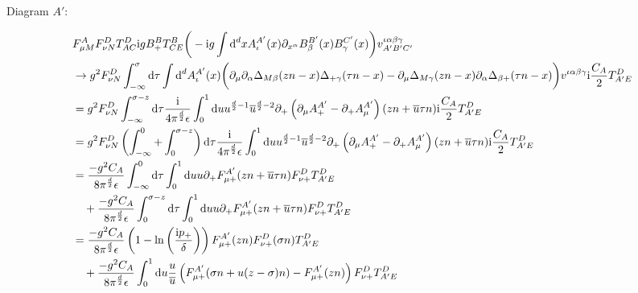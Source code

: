 Diagram $A'$:

\begin{align}
	&F_{\mu M}^{A}F _{\nu N}^D T^D_{AC}\text{i} g B_+^B  T^B_{CE}\bigg(-\text{i} g \int \text{d} ^d xA_\iota^{A'}(x) \partial_{x^\alpha} B_\beta^{B'} (x) B_\gamma^{C'}(x) \bigg) v^{\iota \alpha\beta\gamma}_{A'B'C'}
	\\
	&\rightarrow
	g^2F _{\nu N}^D\int_{-\infty}^\sigma \text{d} \tau \int \text{d} ^d A^{A'}_\iota(x) \bigg( \partial_\mu \partial_\alpha \Delta_{M\beta}(zn-x) \Delta_{+\gamma}(\tau n -x) -\partial_\mu \Delta_{M\gamma}(zn-x) \partial_\alpha \Delta_{\beta+}(\tau n -x) \bigg)v^{\iota \alpha\beta\gamma}\text{i} \frac{C_A}{2}T^D_{A'E}
	\\
	&=
	g^2F _{\nu N}^D\int_{-\infty}^{\sigma - z} \text{d} \tau \frac{\text{i}}{4\pi^{\frac{d}{2}}\epsilon}\int _0^1 \text{d} u u^{\frac{d}{2}-1} \overline u ^{\frac{d}{2}-2}   \partial_+ \left( \partial_\mu A_+^{A'} - \partial_+ A_\mu^{A'}\right)(zn+\overline u \tau n)\text{i} \frac{C_A}{2}T^D_{A'E}
	\\
	&=
	g^2F _{\nu N}^D\left(\int_{-\infty}^{0}+\int_{0}^{\sigma - z}\right) \text{d} \tau \frac{\text{i}}{4\pi^{\frac{d}{2}}\epsilon}\int _0^1 \text{d} u u^{\frac{d}{2}-1} \overline u ^{\frac{d}{2}-2}   \partial_+ \left( \partial_\mu A_+^{A'} - \partial_+ A_\mu^{A'}\right)(zn+\overline u \tau n)\text{i} \frac{C_A}{2}T^D_{A'E}
	\\
	&=
	\frac{-g^2C_A}{8\pi^{\frac{d}{2}}\epsilon}\int_{-\infty}^0\text{d} \tau\int _0^1 \text{d} u u  \partial_+ F_{\mu +}^{A'}(zn+\overline u \tau n)F _{\nu +}^DT^D_{A'E}
	\\&~~~
	+\frac{-g^2C_A}{8\pi^{\frac{d}{2}}\epsilon}\int_{0}^{\sigma -z}\text{d} \tau\int _0^1 \text{d} u u  \partial_+ F_{\mu +}^{A'}(zn+\overline u \tau n)F _{\nu +}^DT^D_{A'E}
	\\
	&=
	\frac{-g^2C_A}{8\pi^{\frac{d}{2}}\epsilon}\left(1-\ln\left(\frac{\text{i} p_{+}}{\delta}\right)\right)F_{\mu +}^{A'}(zn)F _{\nu +}^D(\sigma n)T^D_{A'E}
	\\&~~~
	+\frac{-g^2C_A}{8\pi^{\frac{d}{2}}\epsilon}\int _0^1 \text{d} u \frac{u}{\overline u} \left( F_{\mu +}^{A'}(\sigma n+ u(z-\sigma)n) - F_{\mu +}^{A'}(zn)\right)F _{\nu +}^DT^D_{A'E}
\end{align}

